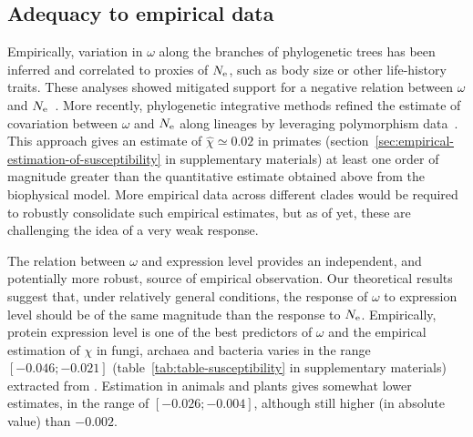 \subsection{Adequacy to empirical data}
Empirically, variation in $\omega$ along the branches of phylogenetic trees has been inferred and correlated to proxies of $N_{\text{e}}$, such as body size or other life-history traits.
These analyses showed mitigated support for a negative relation between $\omega$ and $N_{\text{e}}$~\citep{Lanfear2014}.
More recently, phylogenetic integrative methods refined the estimate of covariation between $\omega$ and $N_{\text{e}}$ along lineages by leveraging polymorphism data~\citep{Brevet2019}.
This approach gives an estimate of $\hat{\chi} \simeq 0.02$ in primates (section~\ref{sec:empirical-estimation-of-susceptibility} in supplementary materials) at least one order of magnitude greater than the quantitative estimate obtained above from the biophysical model.
More empirical data across different clades would be required to robustly consolidate such empirical estimates, but as of yet, these are challenging the idea of a very weak response.

The relation between $\omega$ and expression level provides an independent, and potentially more robust, source of empirical observation.
Our theoretical results suggest that, under relatively general conditions, the response of $\omega$ to expression level should be of the same magnitude than the response to $N_{\text{e}}$.
Empirically, protein expression level is one of the best predictors of $\omega$ and the empirical estimation of $\chi$ in fungi, archaea and bacteria varies in the range $[-0.046;-0.021]$ (table~\ref{tab:table-susceptibility} in supplementary materials) extracted from \citet{Zhang2015}.
Estimation in animals and plants gives somewhat lower estimates, in the range of $[-0.026;-0.004]$, although still higher (in absolute value) than $-0.002$.

